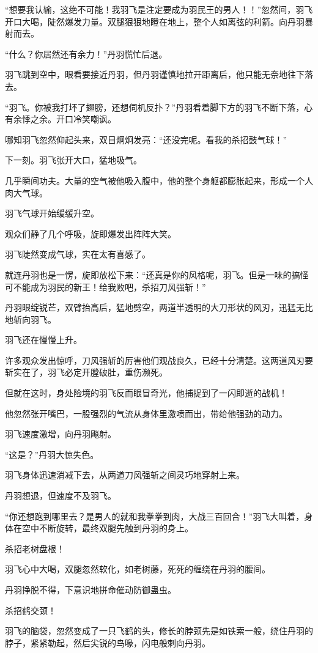 \begin{this_body}
“想要我认输，这绝不可能！我羽飞是注定要成为羽民王的男人！！”忽然间，羽飞开口大喝，陡然爆发力量。双腿狠狠地瞪在地上，整个人如离弦的利箭。向丹羽暴射而去。

“什么？你居然还有余力！”丹羽慌忙后退。

羽飞跳到空中，眼看要接近丹羽，但丹羽谨慎地拉开距离后，他只能无奈地往下落去。

“羽飞。你被我打坏了翅膀，还想伺机反扑？”丹羽看着脚下方的羽飞不断下落，心有余悸之余。开口冷笑嘲讽。

哪知羽飞忽然仰起头来，双目炯炯发亮：“还没完呢。看我的杀招鼓气球！”

下一刻。羽飞张开大口，猛地吸气。

几乎瞬间功夫。大量的空气被他吸入腹中，他的整个身躯都膨胀起来，形成一个人肉大气球。

羽飞气球开始缓缓升空。

观众们静了几个呼吸，旋即爆发出阵阵大笑。

羽飞陡然变成气球，实在太有喜感了。

就连丹羽也是一愣，旋即放松下来：“还真是你的风格呢，羽飞。但是一味的搞怪可不能成为羽民的新王！给我败吧，杀招刀风强斩！”

丹羽眼绽锐芒，双臂抬高后，猛地劈空，两道半透明的大刀形状的风刃，迅猛无比地斩向羽飞。

羽飞还在慢慢上升。

许多观众发出惊呼，刀风强斩的厉害他们观战良久，已经十分清楚。这两道风刃要斩实在了，羽飞必定开膛破肚，重伤濒死。

但就在这时，身处险境的羽飞反而眼冒奇光，他捕捉到了一闪即逝的战机！

他忽然张开嘴巴，一股强烈的气流从身体里激喷而出，带给他强劲的动力。

羽飞速度激增，向丹羽飚射。

“这是？”丹羽大惊失色。

羽飞身体迅速消减下去，从两道刀风强斩之间灵巧地穿射上来。

丹羽想退，但速度不及羽飞。

“你还想跑到哪里去？是男人的就和我拳拳到肉，大战三百回合！”羽飞大叫着，身体在空中不断旋转，最终双腿先触到丹羽的身上。

杀招老树盘根！

羽飞心中大喝，双腿忽然软化，如老树藤，死死的缠绕在丹羽的腰间。

丹羽挣脱不得，下意识地拼命催动防御蛊虫。

杀招鹤交颈！

羽飞的脑袋，忽然变成了一只飞鹤的头，修长的脖颈先是如铁索一般，绕住丹羽的脖子，紧紧勒起，然后尖锐的鸟喙，闪电般刺向丹羽。


\end{this_body}
